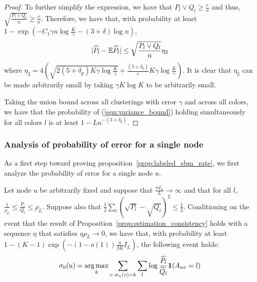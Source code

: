 \begin{proof}
To further simplify the expression, we have that $P_l \vee Q_l \geq \frac{c}{n}$ and thus, $\sqrt{ \frac{P_l \vee Q_l}{n} } \geq \frac{c}{n}$. Therefore, we have that, with probability at least $1 - \exp( -C_1 \gamma n \log \frac{K}{\gamma} - (3 + \delta) \log n)$, 
\begin{align}
| \widehat{P}_l - {\mathbb E} \widehat{P}_l | \leq \sqrt{ \frac{P_l \vee Q_l}{n} } \eta_2 \label{eqn:variance_bound}
\end{align}
where $\eta_2 = 4 \left( \sqrt{2 (5+\delta_p) K \gamma \log \frac{K}{\gamma}} 
      + \frac{(5+\delta_p)}{c} K \gamma \log \frac{K}{\gamma} \right)$. It is clear that $\eta_2$ can be made arbitrarily small by taking $\gamma K \log K$ to be arbitrarily small. 

 Taking the union bound across all clusterings with error $\gamma$ and across all colors, we have that the probability of (\ref{eqn:variance_bound}) holding simultaneously for all colors $l$ is at least $1 - L n^{-(3+\delta_p)}$. 

\end{proof}





\subsubsection{Analysis of probability of error for a single node}


As a first step toward proving proposition~\ref{prop:labeled_sbm_rate}, we first analyze the probability of error for a single node $u$. 

\begin{proposition}
\label{prop:single_node_error_bound}

Let node $u$ be arbitrarily fixed and suppose that $\frac{n I_L}{L} \rightarrow \infty$ and that for all $l$, $\frac{1}{\rho_L} \leq \frac{P_l}{Q_l} \leq \rho_L$.  Suppose also that $\frac{1}{2} \sum_l (\sqrt{P_l} - \sqrt{Q_l})^2 \leq \frac{1}{2}$. Conditioning on the event that the result of Proposition~\ref{prop:estimation_consistency} holds with a sequence $\eta$ that satisfies $\eta \rho_L \rightarrow 0$, we have that, with probability at least $1 - (K-1)\exp \left( - (1 - o(1)) \frac{n}{\beta K} I_L \right)$, the following event holds:
\[
\sigma_0(u) = \mathop{\text{\rm arg\,max}}_k \sum_{v\,: \sigma_u(v)=k} \sum_l \log \frac{\widehat{P}_l}{\widehat{Q}_l} \mbox{\boldmath $1$}(A_{uv} = l) 
\]

\end{proposition}

